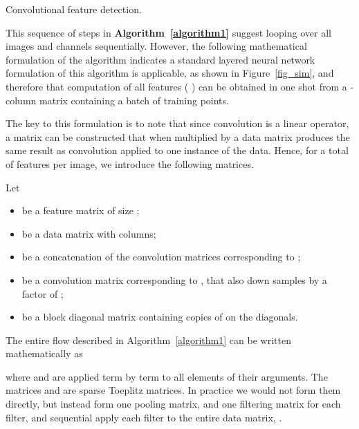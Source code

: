 \documentclass[conference]{IEEEtran}
\begin{document}
\begin{algorithm}
\caption{Convolutional feature detection.}
\BlankLine
{}
\label{algorithm1}
\end{algorithm}


This sequence of steps in  {\bf Algorithm~\ref{algorithm1}} suggest looping over all images and channels sequentially. However, the following mathematical formulation of the  algorithm indicates a standard layered neural network formulation of this algorithm is applicable, as shown in Figure~\ref{fig_sim}, and therefore that computation of all features ( ) can be obtained in one shot from a -column matrix containing a batch of  training points.

The key to this formulation is to note  that since convolution is a linear operator, a matrix can be constructed that when multiplied by a data matrix produces the same result as convolution applied to one instance of the data. Hence, for a total of  features per image, we introduce the following matrices. 

Let 
\begin{itemize}
\item  be a feature matrix of size ;
\item  be a data matrix with  columns;
\item  be a concatenation of the  convolution matrices corresponding to ;
\item  be a convolution matrix corresponding to , that also down samples by a factor of ;
\item  be a block diagonal matrix containing  copies of  on the diagonals.
\end{itemize}
The entire flow described in Algorithm~\ref{algorithm1} can  be written mathematically as

where   and  are applied term by term to all elements of their arguments. The matrices   and  are sparse Toeplitz matrices. In practice we would not form them directly, but instead form one pooling matrix, and one filtering matrix for each filter, and sequential apply each filter to the entire data matrix, .
\end{document}
